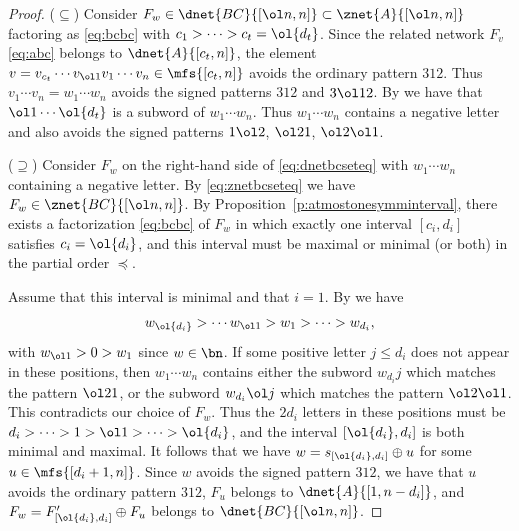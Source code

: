 \begin{proof}
  ($\subseteq$)
  Consider
  $F_w \in \dnet{BC}{[\ol n, n]} \subset \znet{A}{[\ol n, n]}$
  factoring as
  \eqref{eq:bcbc}
  with $c_1 > \cdots > c_t = \ol{d_t}$.
  Since the related network $F_v$ \eqref{eq:abc}
  belongs to
  $\dnet{A}{[c_t, n]}$,
  the element $v = v_{c_t} \cdots v_{\ol1} v_1 \cdots v_n \in \mfs{[c_t,n]}$
  avoids the ordinary pattern $312$.
  Thus $v_1 \cdots v_n = w_1 \cdots w_n$
  avoids the signed patterns $312$ and $3 \ol1 2$.
  By \cite[Obs.\,3.2]{SkanNNDCB}
  we have that
  $\ol 1 \cdots \ol{d_t}$ is a subword of $w_1 \cdots w_n$.
  Thus $w_1 \cdots w_n$ contains a negative letter and also
  avoids the signed patterns $1 \ol2$, $\ol21$, $\ol2\ol1$. 
  
  ($\supseteq$) Consider $F_w$ on the right-hand side of
  \eqref{eq:dnetbcseteq} with $w_1 \cdots w_n$ containing a negative
  letter.
  By \eqref{eq:znetbcseteq}
  we have
  $F_w \in \znet{BC}{[\ol n,n]}$.
  By Proposition~\ref{p:atmostonesymminterval},
  there exists a factorization
  \eqref{eq:bcbc} of $F_w$
  in which exactly one interval $[c_i,d_i]$ satisfies $c_i = \ol{d_i}$,
  and this interval must be maximal or minimal (or both)
  in the partial order $\preceq$.

  Assume that this interval is minimal and that $i = 1$.
  By \cite[Obs.\,3.2]{SkanNNDCB}
  we have
  \begin{equation}\label{eq:decseq}
    w_{\ol{d_i}} > \cdots w_{\ol1} > w_1 > \cdots > w_{d_i},
  \end{equation}
  with $w_{\ol1} > 0 > w_1$ since $w \in \bn$.
  If some positive letter $j \leq d_i$ does not appear in these positions,
  then $w_1 \cdots w_n$ contains either
  the subword $w_{d_i} j$ which matches the pattern $\ol 21$,
  or the subword $w_{d_i} \ol j$ which matches the pattern $\ol 2\ol1$.
  This contradicts our choice of $F_w$.
  Thus
  the $2d_i$ letters in these positions
  must be
  $d_i > \cdots > 1 > \ol 1 > \cdots > \ol{d_i}$,
  and the interval $[\ol{d_i},d_i]$ is both minimal and maximal.
  It follows that we have $w = s_{[\ol{d_i},d_i]} \oplus u$ for some
  $u \in \mfs{[d_i+1,n]}$.
  Since $w$ avoids the signed pattern $312$, we have that
  $u$ avoids the ordinary pattern $312$,
  $F_u$ belongs to $\dnet{A}{[1,n-d_i]}$,
  and $F_w = F'_{[\ol{d_i},d_i]} \oplus F_u$ belongs to $\dnet{BC}{[\ol n,n]}$.


\end{proof}
